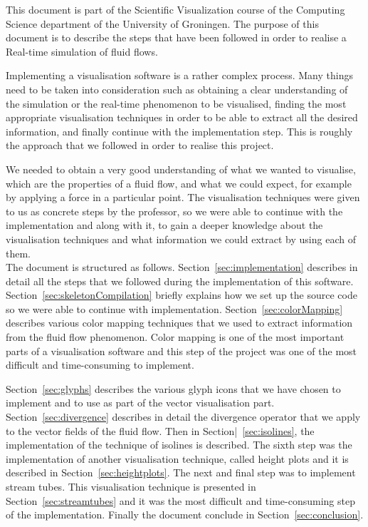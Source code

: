 
This document is part of the Scientific Visualization course of the Computing Science department of the University of Groningen. The purpose of this document is to describe the steps that have been followed in order to realise a Real-time simulation of fluid flows.

Implementing a visualisation software is a rather complex process. Many things need to be taken into consideration such as obtaining a clear understanding of the simulation or the real-time phenomenon to be visualised, finding the most appropriate visualisation techniques in order to be able to extract all the desired information, and finally continue with the implementation step. This is roughly the approach that we followed in order to realise this project.

We needed to obtain a very good understanding of what we wanted to visualise, which are the properties of a fluid flow, and what we could expect, for example by applying a force in a particular point. The visualisation techniques were given to us as concrete steps by the professor, so we were able to continue with the implementation and along with it, to gain a deeper knowledge about the visualisation techniques and what information we could extract by using each of them.\\

The document is structured as follows. Section~\ref{sec:implementation} describes in detail all the steps that we followed during the implementation of this software. Section~\ref{sec:skeletonCompilation} briefly explains how we set up the source code so we were able to continue with implementation. Section~\ref{sec:colorMapping} describes various color mapping techniques that we used to extract information from the fluid flow phenomenon. Color mapping is one of the most important parts of a visualisation software and this step of the project was one of the most difficult and time-consuming to implement.

Section~\ref{sec:glyphs} describes the various glyph icons that we have chosen to implement and to use as part of the vector visualisation part. Section~\ref{sec:divergence} describes in detail the divergence operator that we apply to the vector fields of the fluid flow. Then in Section|~\ref{sec:isolines}, the implementation of the technique of isolines is described. The sixth step was the implementation of another visualisation technique, called height plots and it is described in Section~\ref{sec:heightplots}. The next and final step was to implement stream tubes. This visualisation technique is presented in Section~\ref{sec:streamtubes} and it was the most difficult and time-consuming step of the implementation. Finally the document conclude in Section~\ref{sec:conclusion}.